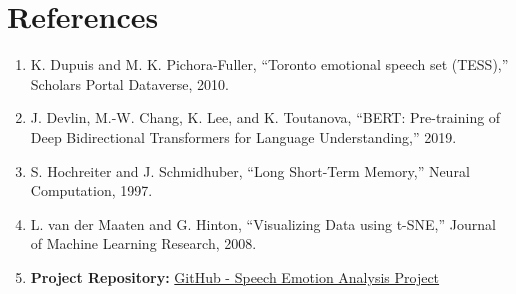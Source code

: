 \documentclass[11pt,journal,onecolumn]{IEEEtran}
\begin{document}
\newpage



\section{References}

\begin{enumerate}
    \item K. Dupuis and M. K. Pichora-Fuller, ``Toronto emotional speech set (TESS),'' Scholars Portal Dataverse, 2010.
    \item J. Devlin, M.-W. Chang, K. Lee, and K. Toutanova, ``BERT: Pre-training of Deep Bidirectional Transformers for Language Understanding,'' 2019.
    \item S. Hochreiter and J. Schmidhuber, ``Long Short-Term Memory,'' Neural Computation, 1997.
    \item L. van der Maaten and G. Hinton, ``Visualizing Data using t-SNE,'' Journal of Machine Learning Research, 2008.
    \item \textbf{Project Repository:}
\href{https://github.com/aaronroy123/speech_analysis_final}{GitHub - Speech Emotion Analysis Project}
\end{enumerate}

\end{document}
